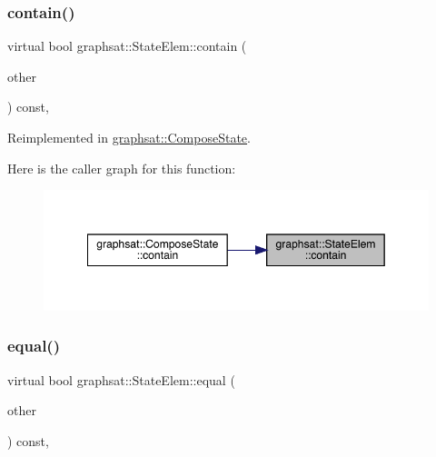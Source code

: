 \subsubsection{\texorpdfstring{contain()}{contain()}}
{\footnotesize\ttfamily virtual bool graphsat\+::\+State\+Elem\+::contain (\begin{DoxyParamCaption}\item[{const \mbox{\hyperlink{classgraphsat_1_1_state_elem}{State\+Elem}} $\ast$}]{other }\end{DoxyParamCaption}) const\hspace{0.3cm}{\ttfamily [inline]}, {\ttfamily [virtual]}}



Reimplemented in \mbox{\hyperlink{classgraphsat_1_1_compose_state_a10249606cb19be7ce9cf17f6fb2e5509}{graphsat\+::\+Compose\+State}}.

Here is the caller graph for this function\+:\nopagebreak
\begin{figure}[H]
\begin{center}
\leavevmode
\includegraphics[width=349pt]{classgraphsat_1_1_state_elem_a9f05de6c6926420c7ba4a79f0fab956f_icgraph}
\end{center}
\end{figure}
\mbox{\label{classgraphsat_1_1_state_elem_a96f98a1a836950bec46b03269defd823}} 
\subsubsection{\texorpdfstring{equal()}{equal()}}
{\footnotesize\ttfamily virtual bool graphsat\+::\+State\+Elem\+::equal (\begin{DoxyParamCaption}\item[{const \mbox{\hyperlink{classgraphsat_1_1_state_elem}{State\+Elem}} $\ast$}]{other }\end{DoxyParamCaption}) const\hspace{0.3cm}{\ttfamily [inline]}, {\ttfamily [virtual]}}



